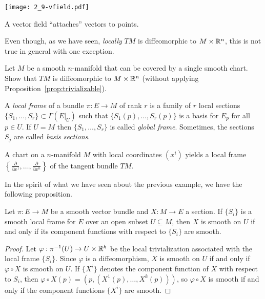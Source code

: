 \begin{marginfigure}
  \texttt{[image: 2\_9-vfield.pdf]}
  \caption{A vector field ``attaches'' vectors to points.}%
  \label{fig:vectorfield-rn}
\end{marginfigure}

Even though, as we have seen, \emph{locally} $TM$ is diffeomorphic to $M\times\mathbb{R}^n$, this is not true in general with one exception.
\begin{exercise}\label{ex:trivializable}
  Let $M$ be a smooth $n$-manifold that can be covered by a single smooth chart.
  Show that $TM$ is diffeomorphic to $M\times\mathbb{R}^n$ (without applying Proposition~\ref{prop:trivializable}).
\end{exercise}

\begin{definition}
  A \emph{local frame} of a bundle $\pi:E\to M$ of rank $r$ is a family of $r$ local sections $\{S_1, \ldots, S_r\}\subset\Gamma(E|_U)$ such that $\{S_1(p), \ldots, S_r(p)\}$ is a basis for $E_p$ for all $p\in U$.
  If $U=M$ then $\{S_1, \ldots, S_r\}$ is called \emph{global frame}.
  Sometimes, the sections $S_j$ are called \emph{basis sections}.
\end{definition}

\begin{example}
  A chart on a $n$-manifold $M$ with local coordinates $(x^i)$ yields a local frame $\left\{\frac{\partial}{\partial x^1}, \ldots, \frac{\partial}{\partial x^n}\right\}$ of the tangent bundle $TM$.
\end{example}

In the spirit of what we have seen about the previous example, we have the following proposition.

\begin{proposition}
  Let $\pi:E \to M$ be a smooth vector bundle and $X:M\to E$ a section.
  If $\{S_i\}$ is a smooth local frame for $E$ over an open subset $U\subseteq M$, then $X$ is smooth on $U$ if and only if its component functions with respect to $\{S_i\}$ are smooth.
\end{proposition}
\begin{proof}
  Let $\varphi:\pi^{-1}(U) \to U\times\mathbb{R}^k$ be the local trivialization associated with the local frame $\{S_i\}$.
  Since $\varphi$ is a diffeomorphism, $X$ is smooth on $U$ if and only if $\varphi\circ X$ is smooth on $U$.
  If $\{X^i\}$ denotes the component function of $X$ with respect to $S_i$, then $\varphi\circ X (p) = (p, (X^1(p), \ldots, X^k(p)))$, so $\varphi\circ X$ is smooth if and only if the component functions $\{X^i\}$ are smooth.
\end{proof}

